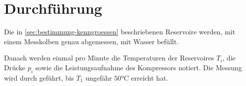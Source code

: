 \section{Durchführung}
\label{sec:Durchführung}

Die in \autoref{sec:bestimmung-kenngroessen} beschriebenen Reservoire werden, mit einem 
Messkolben genau abgemessen, mit Wasser bef\"ullt.

Danach werden einmal pro Minute die Temperaturen der Reservoires $T_i$, die Dr\"ucke $p_i$ 
sowie die Leistungsaufnahme des Kompressors notiert. Die Messung wird durch gef\"uhrt, bis $T_1$ ungef\"ahr
$50 \si{\celsius}$ erreicht hat.

